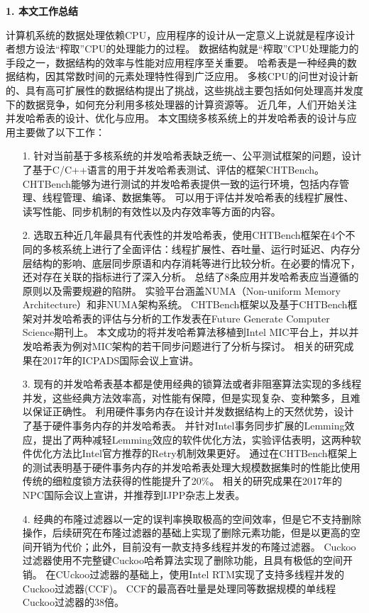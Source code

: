 \begin{summary}
\textbf{1. 本文工作总结}

计算机系统的数据处理依赖CPU，应用程序的设计从一定意义上说就是程序设计者想方设法“榨取”CPU的处理能力的过程。
数据结构就是“榨取”CPU处理能力的手段之一，数据结构的效率与性能对应用程序至关重要。
哈希表是一种经典的数据结构，因其常数时间的元素处理特性得到广泛应用。
多核CPU的问世对设计新的、具有高可扩展性的数据结构提出了挑战，这些挑战主要包括如何处理高并发度下的数据竞争，如何充分利用多核处理器的计算资源等。
近几年，人们开始关注并发哈希表的设计、优化与应用。
本文围绕多核系统上的并发哈希表的设计与应用主要做了以下工作：
\begin{itemize}
	\item[1.] 针对当前基于多核系统的并发哈希表缺乏统一、公平测试框架的问题，设计了基于C/C++语言的用于并发哈希表测试、评估的框架CHTBench。
	CHTBench能够为进行测试的并发哈希表提供一致的运行环境，包括内存管理、线程管理、编译、数据集等。
	可以用于评估并发哈希表的线程扩展性、读写性能、同步机制的有效性以及内存效率等方面的内容。
	\item[2.] 选取五种近几年最具有代表性的并发哈希表，使用CHTBench框架在4个不同的多核系统上进行了全面评估：线程扩展性、吞吐量、运行时延迟、内存分层结构的影响、底层同步原语和内存消耗等进行比较分析。在必要的情况下，还对存在关联的指标进行了深入分析。
	总结了8条应用并发哈希表应当遵循的原则以及需要规避的陷阱。
	实验平台涵盖NUMA（Non-uniform Memory Architecture）和非NUMA架构系统。
	CHTBench框架以及基于CHTBench框架对并发哈希表的评估与分析的工作发表在Future Generate Computer Science期刊上。
	本文成功的将并发哈希算法移植到Intel MIC平台上，并以并发哈希表为例对MIC架构的若干同步问题进行了分析与探讨。
	相关的研究成果在2017年的ICPADS国际会议上宣讲。
	\item[3.] 现有的并发哈希表基本都是使用经典的锁算法或者非阻塞算法实现的多线程并发，这些经典方法效率高，对性能有保障，但是实现复杂、变种繁多，且难以保证正确性。
	利用硬件事务内存在设计并发数据结构上的天然优势，设计了基于硬件事务内存的并发哈希表。
	并针对Intel事务同步扩展的Lemming效应，提出了两种减轻Lemming效应的软件优化方法，实验评估表明，这两种软件优化方法比Intel官方推荐的Retry机制效果更好。
	通过在CHTBench框架上的测试表明基于硬件事务内存的并发哈希表处理大规模数据集时的性能比使用传统的细粒度锁方法获得的性能提升了20\%。
	相关的研究成果在2017年的NPC国际会议上宣讲，并推荐到IJPP杂志上发表。
	\item[4.] 经典的布隆过滤器以一定的误判率换取极高的空间效率，但是它不支持删除操作，后续研究在布隆过滤器的基础上实现了删除元素功能，但是以更高的空间开销为代价；此外，目前没有一款支持多线程并发的布隆过滤器。
	Cuckoo过滤器使用不完整键Cuckoo哈希算法实现了删除功能，且具有极低的空间开销。
	在CUckoo过滤器的基础上，使用Intel RTM实现了支持多线程并发的Cuckoo过滤器(CCF)。
	CCF的最高吞吐量是处理同等数据规模的单线程Cuckoo过滤器的38倍。
\end{itemize}


\end{summary}
